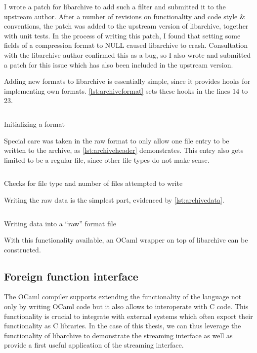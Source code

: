 \documentclass[parskip=half]{scrreprt}
\newcommand\inline[1]{{\addfontfeature{Letters=SmallCaps}#1}}
\begin{document}
I wrote a patch for libarchive to add such a filter and submitted it to the
upstream author. After a number of revisions on functionality and code style \&
conventions, the patch was added to the upstream version of libarchive,
together with unit tests. In the process of writing this patch, I found that
setting some fields of a compression format to \inline{NULL} caused libarchive
to crash. Consultation with the libarchive author confirmed this as a bug, so I
also wrote and submitted a patch for this issue which has also been included in
the upstream version.

Adding new formats to libarchive is essentially simple, since it provides hooks
for implementing own formats. \autoref{lst:archiveformat} sets these hooks in
the lines 14 to 23.

\begin{listing}[h]
  \inputminted[linenos,fontsize=\small]{c}{archive-set-format.c}
  \caption{Initializing a format}
  \label{lst:archiveformat}
\end{listing}

Special care was taken in the raw format to only allow one file entry to be
written to the archive, as \autoref{lst:archiveheader} demonstrates. This entry
also gets limited to be a regular file, since other file types do not make
sense.

\begin{listing}[h]
  \inputminted[linenos,fontsize=\small]{c}{archive-write-header.c}
  \caption{Checks for file type and number of files attempted to write}
  \label{lst:archiveheader}
\end{listing}

Writing the raw data is the simplest part, evidenced by
\autoref{lst:archivedata}.

\begin{listing}[h]
  \inputminted[linenos,fontsize=\small]{c}{archive-write-data.c}
  \caption{Writing data into a \enquote{raw} format file}
  \label{lst:archivedata}
\end{listing}

With this functionality available, an OCaml wrapper on top of libarchive can be
constructed.

\subsection{Foreign function interface}
\label{sec:ffi}

The OCaml compiler supports extending the functionality of the language not
only by writing OCaml code but it also allows to interoperate with C code. This
functionality is crucial to integrate with external systems which often export
their functionality as C libraries. In the case of this thesis, we can thus
leverage the functionality of libarchive to demonstrate the streaming interface
as well as provide a first useful application of the streaming interface.
\end{document}
